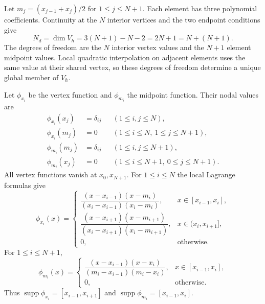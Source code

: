 \documentclass[11pt,a4paper]{article}
\begin{document}
Let \(m_j=(x_{j-1}+x_j)/2\) for \(1\le j\le N+1\). Each element
has three polynomial coefficients. Continuity at the \(N\) interior
vertices and the two endpoint conditions give
\[
  N_d=\dim V_h=3(N+1)-N-2=2N+1=N+(N+1).
\]
The degrees of freedom are the \(N\) interior vertex values and the
\(N+1\) element midpoint values. Local quadratic interpolation on adjacent
elements uses the same value at their shared vertex, so these degrees of
freedom determine a unique global member of \(V_h\).

\begin{center}
\end{center}

Let \(\phi_{x_i}\) be the vertex function and \(\phi_{m_i}\) the
midpoint function. Their nodal values are
\[
\begin{aligned}
 \phi_{x_i}(x_j)&=\delta_{ij} &&(1\le i,j\le N),\\
 \phi_{x_i}(m_j)&=0 &&(1\le i\le N,\ 1\le j\le N+1),\\
 \phi_{m_i}(m_j)&=\delta_{ij} &&(1\le i,j\le N+1),\\
 \phi_{m_i}(x_j)&=0 &&(1\le i\le N+1,\ 0\le j\le N+1).
\end{aligned}
\]
All vertex functions vanish at \(x_0,x_{N+1}\). For \(1\le i\le N\) the
local Lagrange formulas give
\[
 \phi_{x_i}(x)=
 \begin{cases}
 \dfrac{(x-x_{i-1})(x-m_i)}{(x_i-x_{i-1})(x_i-m_i)},
    & x\in[x_{i-1},x_i],\\[6pt]
 \dfrac{(x-x_{i+1})(x-m_{i+1})}{(x_i-x_{i+1})(x_i-m_{i+1})},
    & x\in(x_i,x_{i+1}],\\[6pt]
 0,&\text{otherwise}.
 \end{cases}
\]
For \(1\le i\le N+1\),
\[
 \phi_{m_i}(x)=
 \begin{cases}
 \dfrac{(x-x_{i-1})(x-x_i)}{(m_i-x_{i-1})(m_i-x_i)},
      &x\in[x_{i-1},x_i],\\[6pt]
 0,&\text{otherwise}.
 \end{cases}
\]
Thus \(\operatorname{supp}\phi_{x_i}=[x_{i-1},x_{i+1}]\) and
\(\operatorname{supp}\phi_{m_i}=[x_{i-1},x_i]\).
\end{document}
